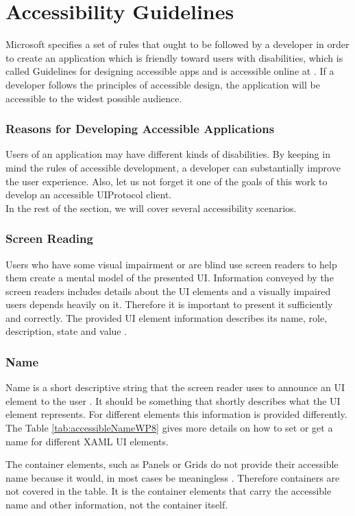 \section{Accessibility Guidelines}
\label{sec:accGuidelines}
Microsoft specifies a set of rules that ought to be followed by a developer in order to create an application which is friendly toward users with disabilities, which is called Guidelines for designing accessible apps and is accessible online at \cite{wp8guide}. If a developer follows the principles of accessible design, the application will be accessible to the widest possible audience.

\subsubsection{Reasons for Developing Accessible Applications}
Users of an application may have different kinds of disabilities. By keeping in mind the rules of accessible development, a developer can substantially improve the user experience. Also, let us not forget it one of the goals of this work to develop an accessible UIProtocol client.
\\In the rest of the section, we will cover several accessibility scenarios.

\subsubsection{Screen Reading}
Users who have some visual impairment or are blind use screen readers to help them create a mental model of the presented UI. Information conveyed by the screen readers includes details about the UI elements and a visually impaired users depends heavily on it. Therefore it is important to present it sufficiently and correctly.
The provided UI element information describes its name, role, description, state and value \cite{wp8guide}.

\subsubsection{Name}
Name is a short descriptive string that the screen reader uses to announce an UI element to the user \cite{wp8guide}. It should be something that shortly describes what the UI element represents. For different elements this information is provided differently. The Table \ref{tab:accessibleNameWP8} gives more details on how to set or get a name for different XAML UI elements.



The container elements, such as Panels or Grids do not provide their accessible name because it would, in most cases be meaningless \cite{wp8guide}. Therefore containers are not covered in the table.
It is the container elements that carry the accessible name and other information, not the container itself.

